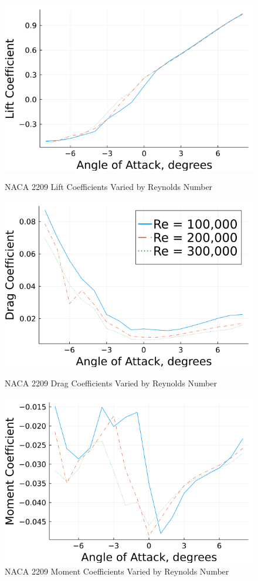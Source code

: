 \documentclass{article}
\begin{document}
\begin{figure}[!htb]
  \includegraphics[width=\linewidth]{Figure7.png}
  \caption{NACA 2209 Lift Coefficients Varied by Reynolds Number}\label{fig:7}
\endminipage\hfill
{}
  \includegraphics[width=\linewidth]{Figure8.png}
  \caption{NACA 2209 Drag Coefficients Varied by Reynolds Number}\label{fig:8}
\endminipage\hfill
{}
  \includegraphics[width=\linewidth]{Figure9.png}
  \caption{NACA 2209 Moment Coefficients Varied by Reynolds Number}\label{fig:9}
\endminipage
\end{figure}
\end{document}

